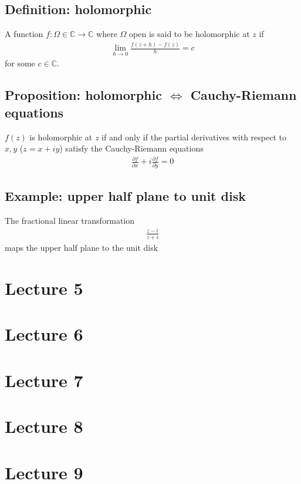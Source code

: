 \documentclass[11pt]{article}
\newcommand{\C}{\mathbb{C}}
\begin{document}
\subsection{Definition: holomorphic}
A function $f: \Omega \in \C \to \C$ where $\Omega$ open is said to be holomorphic at $z$ if 
\begin{align*}
    \lim_{h \to 0} \frac{f(z+h)- f(z)}{h} = c
\end{align*} 
for some $c \in \C$.

\subsection{Proposition: holomorphic $\Longleftrightarrow$ Cauchy-Riemann equations}
$f(z)$ is holomorphic at $z$ if and only if the partial derivatives with respect to $x,y$ ($z = x+iy$) satisfy the Cauchy-Riemann equations
\begin{align*}
    \frac{\partial f}{\partial x} + i \frac{\partial f}{\partial y} = 0
\end{align*}

\subsection{Example: upper half plane to unit disk}
The fractional linear transformation 
\begin{align*}
    \frac{z-i}{z+i}
\end{align*}
maps the upper half plane to the unit disk

\section{Lecture 5}

\section{Lecture 6}

\section{Lecture 7}

\section{Lecture 8}

\section{Lecture 9}
\end{document}
